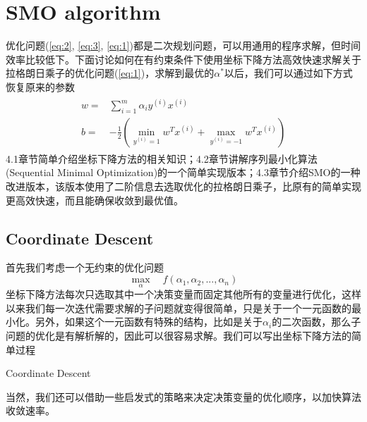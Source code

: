 \documentclass[11pt]{article}
\begin{document}
\section{SMO algorithm}\label{optimization}
优化问题(\ref{eq:2}, \ref{eq:3}, \ref{eq:1})都是二次规划问题，可以用通用的程序求解，但时间效率比较低下。下面讨论如何在有约束条件下使用坐标下降方法高效快速求解关于拉格朗日乘子的优化问题(\ref{eq:1})，求解到最优的$\alpha^*$以后，我们可以通过如下方式恢复原来的参数
\begin{align}\label{eq:wb}
\begin{split}
w=&\sum_{i=1}^m\alpha_iy^{(i)}x^{(i)}\\
b=&-\frac{1}{2}\left(\min_{y^{(i)}=1}w^Tx^{(i)} + \max_{y^{(i)}=-1}w^Tx^{(i)}\right)
\end{split}
\end{align}
4.1章节简单介绍坐标下降方法的相关知识；4.2章节讲解序列最小化算法(Sequential Minimal Optimization)的一个简单实现版本；4.3章节介绍SMO的一种改进版本，该版本使用了二阶信息去选取优化的拉格朗日乘子，比原有的简单实现更高效快速，而且能确保收敛到最优值。

\subsection{Coordinate Descent}
首先我们考虑一个无约束的优化问题
\begin{equation}
\max_\alpha\quad f(\alpha_1, \alpha_2, ..., \alpha_n)
\end{equation}
坐标下降方法每次只选取其中一个决策变量而固定其他所有的变量进行优化，这样以来我们每一次迭代需要求解的子问题就变得很简单，只是关于一个一元函数的最小化。另外，如果这个一元函数有特殊的结构，比如是关于$\alpha_i$的二次函数，那么子问题的优化是有解析解的，因此可以很容易求解。我们可以写出坐标下降方法的简单过程

\begin{algorithm}[H] 
	\caption{Coordinate Descent}
	\label{alg:loop}
	\begin{algorithmic}[1]
		\Statex
		\EndFor
		\EndWhile
	\end{algorithmic}
\end{algorithm}

当然，我们还可以借助一些启发式的策略来决定决策变量的优化顺序，以加快算法收敛速率。
\end{document}
